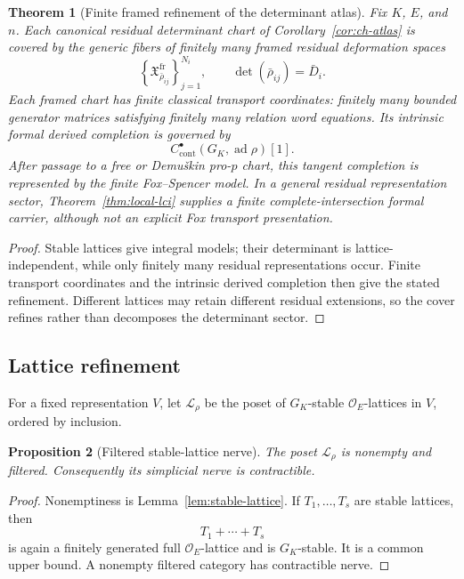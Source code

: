 \documentclass[11pt]{article}
\newtheorem{theorem}{Theorem}[section]
\newtheorem{proposition}[theorem]{Proposition}
\theoremstyle{definition}
\begin{document}
\begin{theorem}[Finite framed refinement of the determinant atlas]\label{thm:finite-residual-atlas}
Fix $K$, $E$, and $n$.  Each canonical residual determinant chart of Corollary~\ref{cor:ch-atlas} is covered by the generic fibers of finitely many framed residual deformation spaces
\[
\left\{\mathfrak X_{\bar\rho_{ij}}^{\mathrm{fr}}\right\}_{j=1}^{N_i},
\qquad
\det(\bar\rho_{ij})=\bar D_i.
\]
Each framed chart has finite classical transport coordinates: finitely many bounded generator matrices satisfying finitely many relation word equations.  Its intrinsic formal derived completion is governed by
\[
C^\bullet_{\mathrm{cont}}(G_K,\operatorname{ad}\rho)[1].
\]
After passage to a free or Demu\v{s}kin pro-$p$ chart, this tangent completion is represented by the finite Fox--Spencer model.  In a general residual representation sector, Theorem~\ref{thm:local-lci} supplies a finite complete-intersection formal carrier, although not an explicit Fox transport presentation.
\end{theorem}

\begin{proof}
Stable lattices give integral models; their determinant is lattice-independent, while only finitely many residual representations occur.  Finite transport coordinates and the intrinsic derived completion then give the stated refinement.  Different lattices may retain different residual extensions, so the cover refines rather than decomposes the determinant sector.
\end{proof}

\subsection{Lattice refinement}\label{subsec:lattice-refinement}

For a fixed representation $V$, let $\mathcal L_\rho$ be the poset of $G_K$-stable $\mathcal O_E$-lattices in $V$, ordered by inclusion.

\begin{proposition}[Filtered stable-lattice nerve]\label{prop:lattice-nerve}
The poset $\mathcal L_\rho$ is nonempty and filtered.  Consequently its simplicial nerve is contractible.
\end{proposition}

\begin{proof}
Nonemptiness is Lemma~\ref{lem:stable-lattice}.  If $T_1,\ldots,T_s$ are stable lattices, then
\[
T_1+\cdots+T_s
\]
is again a finitely generated full $\mathcal O_E$-lattice and is $G_K$-stable.  It is a common upper bound.  A nonempty filtered category has contractible nerve.
\end{proof}
\end{document}
